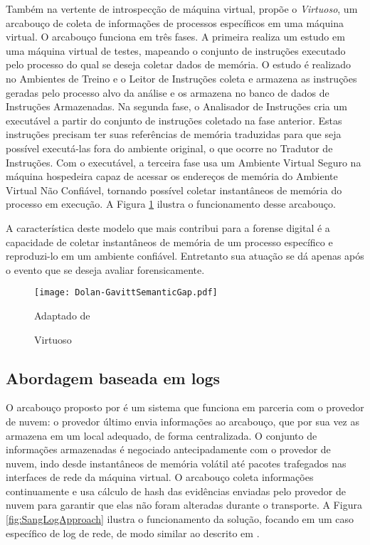 Também na vertente de introspecção de máquina virtual, \cite{Dolan-GavittSemanticGap:2011} propõe o \textit{Virtuoso}, um arcabouço de coleta de informações de processos específicos em uma máquina virtual.
%
O arcabouço funciona em três fases.
%
A primeira realiza um estudo em uma máquina virtual de testes, mapeando o conjunto de instruções executado pelo processo do qual se deseja coletar dados de memória. 
%
O estudo é realizado no Ambientes de Treino e o Leitor de Instruções coleta e armazena as instruções geradas pelo processo alvo da análise e os armazena no banco de dados de Instruções Armazenadas.
%
Na segunda fase, o Analisador de Instruções cria um executável a partir do conjunto de instruções coletado na fase anterior. Estas instruções precisam ter suas referências de memória traduzidas para que seja possível executá-las fora do ambiente original, o que ocorre no Tradutor de Instruções.
%
Com o executável, a terceira fase usa um Ambiente Virtual Seguro na máquina hospedeira capaz de acessar os endereços de memória do Ambiente Virtual Não Confiável, tornando possível coletar instantâneos de memória do processo em execução.
%
A Figura \ref{fig:Dolan-GavittSemanticGap} ilustra o funcionamento desse arcabouço. 


A característica deste modelo que mais contribui para a forense digital é a capacidade de coletar instantâneos de memória de um processo específico e reproduzi-lo em um ambiente confiável. Entretanto  sua atuação se dá apenas após o evento que se deseja avaliar forensicamente.
%


\begin{figure}[htb!]
\footnotesize
\caption{Virtuoso}
\texttt{[image: Dolan-GavittSemanticGap.pdf]}
\centering
\label{fig:Dolan-GavittSemanticGap}
\begin{center}
Adaptado de \cite{Dolan-GavittSemanticGap:2011} 
\end{center}
\end{figure}


\subsection{Abordagem baseada em logs}
\label{sec:modelologs}

O arcabouço proposto por \cite{SangLogApproach:2013} é um sistema que funciona em parceria com o provedor de nuvem: o provedor último envia informações ao arcabouço, que por sua vez as armazena em um local adequado, de forma centralizada.
%
O conjunto de informações armazenadas é negociado antecipadamente com o provedor de nuvem, indo desde instantâneos de memória volátil até pacotes trafegados nas interfaces de rede da máquina virtual.
%
O arcabouço coleta informações continuamente e usa cálculo de hash das evidências enviadas pelo provedor de nuvem para garantir que elas não foram alteradas durante o transporte.
%
A Figura \ref{fig:SangLogApproach} ilustra o funcionamento da solução, focando em um caso específico de log de rede, de modo similar ao descrito em \cite{SangLogApproach:2013}.


